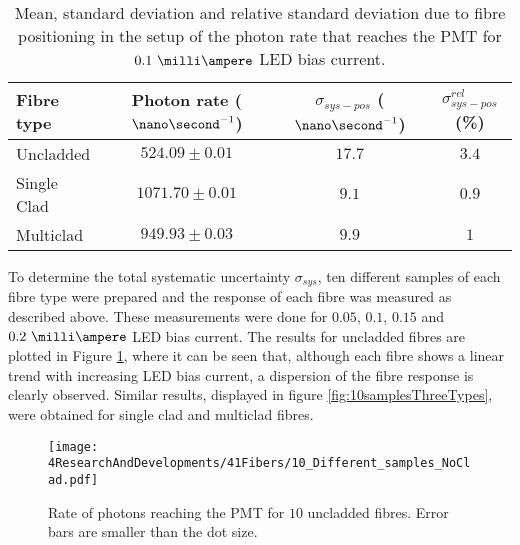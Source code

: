 \begin{table}[htbp]
\centering{}%
\begin{tabular}{lccc}
\toprule 
Fibre type & Photon rate ($\nano\second^{-1}$) & $\sigma_{sys-pos}$ ($\nano\second^{-1}$) & $\sigma^{rel}_{sys-pos}$ (\%) \tabularnewline
\midrule
\midrule 
Uncladded & $524.09 \pm 0.01$ & $17.7$ & $3.4$ \tabularnewline
Single Clad & $1071.70 \pm 0.01$ & $9.1$ & $0.9$ \tabularnewline
Multiclad & $949.93 \pm 0.03$ & $9.9$ & $1$ \tabularnewline
\bottomrule
\end{tabular}
\caption{Mean, standard deviation and relative standard deviation due to fibre positioning in the setup of the photon rate that reaches the PMT for $0.1~\milli\ampere$ LED bias current.}
\label{tab:PositionStandardDeviation}
\end{table}



To determine the total systematic uncertainty $\sigma_{sys}$, ten different samples of each fibre type were prepared and the response of each fibre was measured as described above. These measurements were done for $0.05$, $0.1$, $0.15$ and $0.2~\milli\ampere$ LED bias current. The results for uncladded fibres are plotted in Figure \ref{fig:10samplesNC}, where it can be seen that, although each fibre shows a linear trend with increasing LED bias current, a dispersion of the fibre response is clearly observed. Similar results, displayed in figure \ref{fig:10samplesThreeTypes}, were obtained for single clad and multiclad fibres.

\begin{figure}[h]
\centering
\texttt{[image: 4ResearchAndDevelopments/41Fibers/10\_Different\_samples\_NoClad.pdf]}
\caption{Rate of photons reaching the PMT for $10$ uncladded fibres. Error bars are smaller than the dot size.\label{fig:10samplesNC}}
\end{figure}

